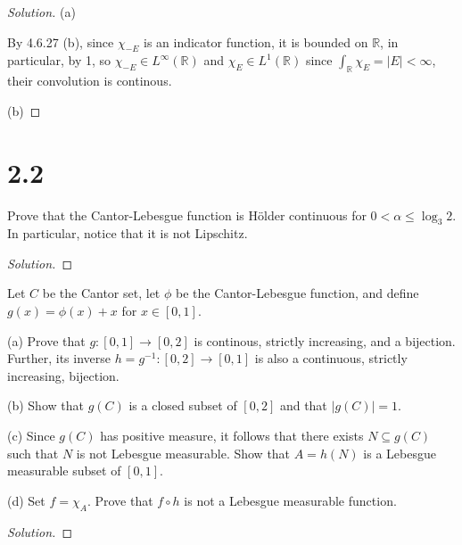 \documentclass[10pt]{article}
\newenvironment{problem}[2][Problem]{\begin{trivlist}
\item[\hskip \labelsep {\bfseries #1}\hskip \labelsep {\bfseries #2.}]}{\end{trivlist}}
\begin{document}
\begin{proof}[Solution]

(a)

By 4.6.27 (b), since $\chi_{-E}$ is an indicator function, it is bounded on $\mathbb{R}$, in particular, by 1, so $\chi_{-E} \in L^\infty(\mathbb{R})$ and $\chi_{E} \in L^1(\mathbb{R})$ since $\int_{\mathbb{R}} \chi_{E} = |E|< \infty$, their convolution is continous.

(b)



\end{proof}

\section*{2.2}

\begin{problem}{5.1.5}

Prove that the Cantor-Lebesgue function is H\"older continuous for $0 < \alpha \leq \log_3 2$. In particular, notice that it is not Lipschitz.

\end{problem}
\begin{proof}[Solution]

\end{proof}

\begin{problem}{5.1.7}

Let $C$ be the Cantor set, let $\phi$ be the Cantor-Lebesgue function, and define $g(x) = \phi(x) + x$ for $x \in [0,1]$.

(a) Prove that $g: [0,1] \to [0,2]$ is continous, strictly increasing, and a bijection. Further, its inverse $h = g^{-1}: [0,2] \to [0,1]$ is also a continuous, strictly increasing, bijection.

(b) Show that $g(C)$ is a closed subset of $[0,2]$ and that $|g(C)| = 1$.

(c) Since $g(C)$ has positive measure, it follows that there exists $N \subseteq g(C)$ such that $N$ is not Lebesgue measurable. Show that $A = h(N)$ is a Lebesgue measurable subset of $[0,1]$.

(d) Set $f = \chi_A$. Prove that $f \circ h$ is not a Lebesgue measurable function.

\end{problem}
\begin{proof}[Solution]


\end{proof}

 
\end{document}
